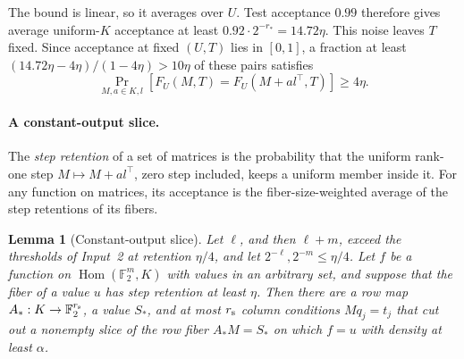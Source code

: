 \documentclass[11pt]{article}
\newtheorem{lemma}[theorem]{Lemma}
\newcommand{\F}{\mathbb F}
\newcommand{\Hom}{\operatorname{Hom}}
\begin{document}
The bound is linear, so it averages over $U$. Test acceptance $0.99$
therefore gives average uniform-$K$ acceptance at least
$0.92\cdot2^{-r_*}=14.72\eta$. This noise leaves $T$ fixed. Since
acceptance at fixed $(U,T)$ lies in $[0,1]$, a fraction at least
$(14.72\eta-4\eta)/(1-4\eta)>10\eta$ of these pairs satisfies
\begin{equation}\label{eq:good-pair}
 \Pr_{M,a\in K,l}[F_U(M,T)=F_U(M+a l^\top,T)]\ge4\eta.
\end{equation}

\paragraph{A constant-output slice.}
The \emph{step retention} of a set of matrices is the probability that the
uniform rank-one step $M\mapsto M+al^\top$, zero step included, keeps a
uniform member inside it. For any function on matrices, its acceptance is
the fiber-size-weighted average of the step retentions of its fibers.

\begin{lemma}[Constant-output slice]\label{lem:slice}
Let $\ell$, and then $\ell+m$, exceed the thresholds of Input~2 at retention
$\eta/4$, and let $2^{-\ell},2^{-m}\le\eta/4$. Let $f$ be a function on
$\Hom(\F_2^m,K)$ with values in an arbitrary set, and suppose that the fiber
of a value $u$ has step retention at least $\eta$. Then there are a row
map $A_*:K\to\F_2^{r_{\rm s}}$, a value $S_*$, and at most $r_{\rm s}$ column
conditions $Mq_j=t_j$ that cut out a nonempty slice of the row fiber
$A_*M=S_*$ on which $f=u$ with density at least $\alpha$.
\end{lemma}
\end{document}
